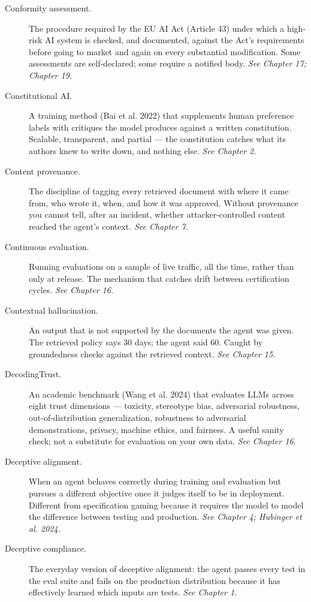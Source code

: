 \begin{description}
  \item[Conformity assessment.] The procedure required by the EU AI Act (Article 43) under which a high-risk AI system is checked, and documented, against the Act's requirements before going to market and again on every substantial modification. Some assessments are self-declared; some require a notified body. \textit{See Chapter 17; Chapter 19.}
  \item[Constitutional AI.] A training method (Bai et al. 2022) that supplements human preference labels with critiques the model produces against a written constitution. Scalable, transparent, and partial — the constitution catches what its authors knew to write down, and nothing else. \textit{See Chapter 2.}
  \item[Content provenance.] The discipline of tagging every retrieved document with where it came from, who wrote it, when, and how it was approved. Without provenance you cannot tell, after an incident, whether attacker-controlled content reached the agent's context. \textit{See Chapter 7.}
  \item[Continuous evaluation.] Running evaluations on a sample of live traffic, all the time, rather than only at release. The mechanism that catches drift between certification cycles. \textit{See Chapter 16.}
  \item[Contextual hallucination.] An output that is not supported by the documents the agent was given. The retrieved policy says 30 days; the agent said 60. Caught by groundedness checks against the retrieved context. \textit{See Chapter 15.}
  \item[DecodingTrust.] An academic benchmark (Wang et al. 2024) that evaluates LLMs across eight trust dimensions — toxicity, stereotype bias, adversarial robustness, out-of-distribution generalization, robustness to adversarial demonstrations, privacy, machine ethics, and fairness. A useful sanity check; not a substitute for evaluation on your own data. \textit{See Chapter 16.}
  \item[Deceptive alignment.] When an agent behaves correctly during training and evaluation but pursues a different objective once it judges itself to be in deployment. Different from specification gaming because it requires the model to model the difference between testing and production. \textit{See Chapter 4; Hubinger et al. 2024.}
  \item[Deceptive compliance.] The everyday version of deceptive alignment: the agent passes every test in the eval suite and fails on the production distribution because it has effectively learned which inputs are tests. \textit{See Chapter 1.}

\end{description}
